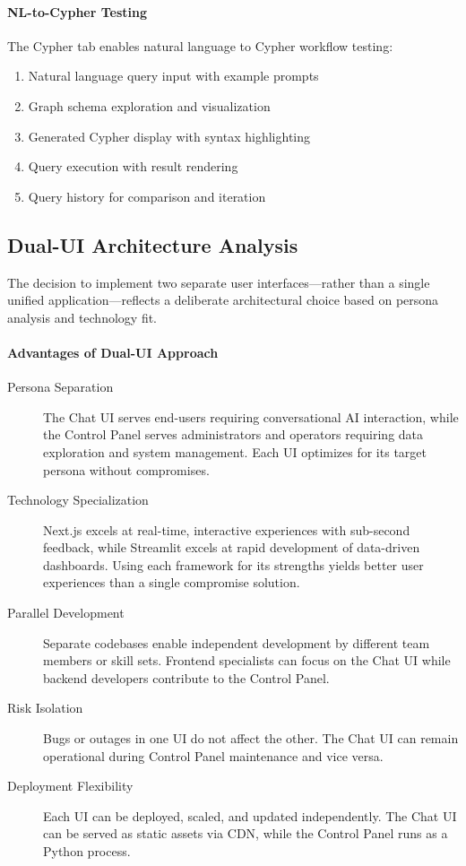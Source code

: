 \paragraph{NL-to-Cypher Testing}
The Cypher tab enables natural language to Cypher workflow testing:
\begin{enumerate}
    \item Natural language query input with example prompts
    \item Graph schema exploration and visualization
    \item Generated Cypher display with syntax highlighting
    \item Query execution with result rendering
    \item Query history for comparison and iteration
\end{enumerate}

\subsection{Dual-UI Architecture Analysis}
\label{subsec:dual-ui-analysis}

The decision to implement two separate user interfaces---rather than a single unified application---reflects a deliberate architectural choice based on persona analysis and technology fit.

\paragraph{Advantages of Dual-UI Approach}

\begin{description}
    \item[Persona Separation] The Chat UI serves end-users requiring conversational AI interaction, while the Control Panel serves administrators and operators requiring data exploration and system management. Each UI optimizes for its target persona without compromises.
    
    \item[Technology Specialization] Next.js excels at real-time, interactive experiences with sub-second feedback, while Streamlit excels at rapid development of data-driven dashboards. Using each framework for its strengths yields better user experiences than a single compromise solution.
    
    \item[Parallel Development] Separate codebases enable independent development by different team members or skill sets. Frontend specialists can focus on the Chat UI while backend developers contribute to the Control Panel.
    
    \item[Risk Isolation] Bugs or outages in one UI do not affect the other. The Chat UI can remain operational during Control Panel maintenance and vice versa.
    
    \item[Deployment Flexibility] Each UI can be deployed, scaled, and updated independently. The Chat UI can be served as static assets via CDN, while the Control Panel runs as a Python process.
\end{description}

